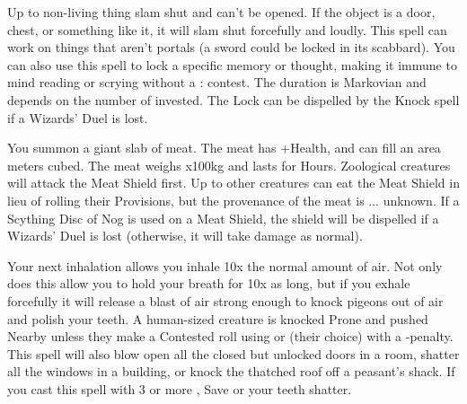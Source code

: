 {Up to \DICE non-living thing slam shut and can't be opened. If the object is
a door, chest, or something like it, it will slam shut forcefully and
loudly. This spell can work on things that aren't portals (a sword could be
locked in its scabbard). You can also use this spell to lock a specific
memory or thought, making it immune to mind reading or scrying without a \RB
: \INT contest.  The duration is Markovian and depends on the number of
\DICE invested.  The Lock can be dispelled by the Knock spell if a Wizards'
Duel is lost.


\SPELL[
  Name=Meat Shield,
  Link=wizardry-meat-shield,
  Paradigm=Biomancy,
  Save=N,
  Duration=Combat or \SUMDICE Minutes ,
  Counter=None ,
  Keywords=None,
  Target=Close and Nearby
]

You summon a giant slab of meat.  The meat has \SUMDICE+\DICE Health, and
can fill an area \DICE meters cubed.  The meat weighs \DICE x100kg and lasts
for \DICE Hours.  Zoological creatures will attack the Meat Shield first. 
Up to \DICE other creatures can eat the Meat Shield in lieu of rolling their
Provisions, but the provenance of the meat is ... unknown.  If a Scything
Disc of Nog is used on a Meat Shield, the shield will be dispelled if a
Wizards' Duel is lost (otherwise, it will take damage as normal).





\SPELL[
  Name=Mighty Lungs,
  Link=wizardry-mighty-lungs,
  Paradigm=Biomancy,
  Save=N,
  Duration=Until exhalation,
  Counter=None ,
  Keywords=Contested,
  Target=Self
]

Your next inhalation allows you inhale 10x the normal amount of air. Not
only does this allow you to hold your breath for 10x as long, but if you
exhale forcefully it will release a blast of air strong enough to knock
pigeons out of air and polish your teeth. A human-sized creature is knocked
Prone and pushed Nearby unless they make a Contested roll using \DEX or \VIG
(their choice) with a -\DICE penalty.  This spell will also blow open all
the closed but unlocked doors in a room, shatter all the windows in a
building, or knock the thatched roof off a peasant's shack. If you cast this
spell with 3 or more \DICE, Save or your teeth shatter.




\SPELL[
  Name=Mirror Image,
  Link=wizardry-mirror-image,
  Paradigm=Entropy,
  Save=N,
  Duration=Combat or \SUMDICE Minutes,
  Counter=None ,
  Keywords=None,
  Target=Self
]



}
